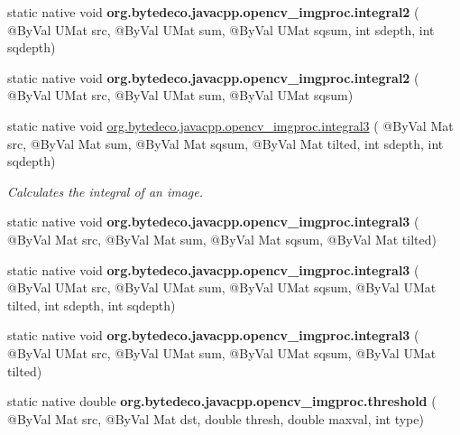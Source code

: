 \begin{DoxyCompactItemize}
\item 
\mbox{\label{group__imgproc__misc_ga4041209a63193bc347e6703a0f238cfa}} 
static native void {\bfseries org.\+bytedeco.\+javacpp.\+opencv\+\_\+imgproc.\+integral2} ( @By\+Val U\+Mat src, @By\+Val U\+Mat sum, @By\+Val U\+Mat sqsum, int sdepth, int sqdepth)
\item 
\mbox{\label{group__imgproc__misc_gae84de723faf3a16192e9edbcbff612e2}} 
static native void {\bfseries org.\+bytedeco.\+javacpp.\+opencv\+\_\+imgproc.\+integral2} ( @By\+Val U\+Mat src, @By\+Val U\+Mat sum, @By\+Val U\+Mat sqsum)
\item 
static native void \hyperlink{group__imgproc__misc_gaac16fc19a4025e3133ded033405c8e25}{org.\+bytedeco.\+javacpp.\+opencv\+\_\+imgproc.\+integral3} ( @By\+Val Mat src, @By\+Val Mat sum, @By\+Val Mat sqsum, @By\+Val Mat tilted, int sdepth, int sqdepth)
\begin{DoxyCompactList}\small\item\em Calculates the integral of an image. \end{DoxyCompactList}\item 
\mbox{\label{group__imgproc__misc_ga92068d61245a7988473977ede383e619}} 
static native void {\bfseries org.\+bytedeco.\+javacpp.\+opencv\+\_\+imgproc.\+integral3} ( @By\+Val Mat src, @By\+Val Mat sum, @By\+Val Mat sqsum, @By\+Val Mat tilted)
\item 
\mbox{\label{group__imgproc__misc_ga832a2f23a1570c99b2b26511b0cdcaef}} 
static native void {\bfseries org.\+bytedeco.\+javacpp.\+opencv\+\_\+imgproc.\+integral3} ( @By\+Val U\+Mat src, @By\+Val U\+Mat sum, @By\+Val U\+Mat sqsum, @By\+Val U\+Mat tilted, int sdepth, int sqdepth)
\item 
\mbox{\label{group__imgproc__misc_gad8327462a83b60bb6760130438f8572a}} 
static native void {\bfseries org.\+bytedeco.\+javacpp.\+opencv\+\_\+imgproc.\+integral3} ( @By\+Val U\+Mat src, @By\+Val U\+Mat sum, @By\+Val U\+Mat sqsum, @By\+Val U\+Mat tilted)
\item 
\mbox{\label{group__imgproc__misc_gad4a3818694ba0a8e1897cd241eaf47fe}} 
static native double {\bfseries org.\+bytedeco.\+javacpp.\+opencv\+\_\+imgproc.\+threshold} ( @By\+Val Mat src, @By\+Val Mat dst, double thresh, double maxval, int type)

\end{DoxyCompactItemize}
